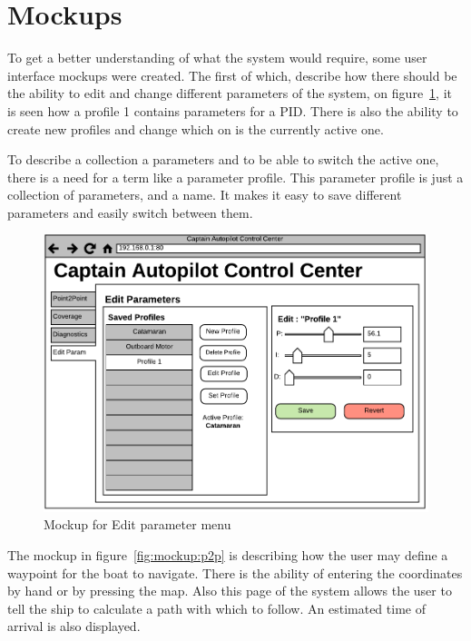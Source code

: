 \section{Mockups}
To get a better understanding of what the system would require, some user interface mockups were created. 
The first of which, describe how there should be the ability to edit and change different parameters of the system, on figure~\ref{fig:mockup:edit_param}, it is seen how a profile 1 contains parameters for a PID. There is also the ability to create new profiles and change which on is the currently active one.

To describe a collection a parameters and to be able to switch the active one, there is a need for a term like a parameter profile.
This parameter profile is just a collection of parameters, and a name. It makes it easy to save different parameters and easily switch between them.

\begin{figure}[H]
	\centering
	\includegraphics[width=1\linewidth]{Images/Requirements_specification/UI_Mockup_Edit_param.pdf}
	\caption{Mockup for Edit parameter menu}
	\label{fig:mockup:edit_param}
\end{figure}

The mockup in figure~\ref{fig:mockup:p2p} is describing how the user may define a waypoint for the boat to navigate. There is the ability of entering the coordinates by hand or by pressing the map. Also this page of the system allows the user to tell the ship to calculate a path with which to follow. An estimated time of arrival is also displayed.

